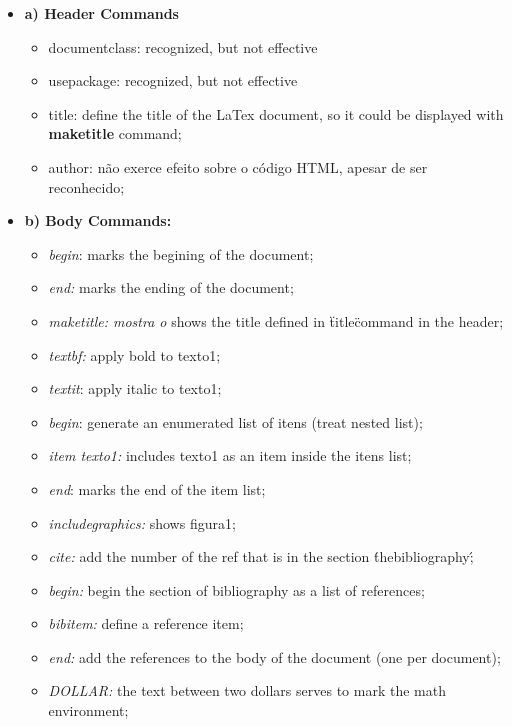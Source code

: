 \documentclass{article}
\begin{document}
\begin{itemize}

	\item \textbf{a) Header Commands}
		\begin{itemize}
			 \item documentclass: recognized, but not effective
			 \item usepackage:  recognized, but not effective
			 \item title: define the title of the LaTex document, so it could be displayed with \textbf{maketitle} command;
			 \item author: não exerce efeito sobre o código HTML, apesar de ser reconhecido;
		\end{itemize}

	\item \textbf{b) Body Commands:}
		\begin{itemize}
	 		\item \textit{begin}: marks the begining of the document;
	 		\item \textit{end:} marks the ending of the document;
	 		\item \textit{maketitle: mostra o} shows the title defined in \"title\" command in the header;
	 		\item \textit{textbf:} apply bold to texto1;
	 		\item \textit{textit}: apply italic to texto1;
	 		\item \textit{begin}: generate an enumerated list of itens (treat nested list);
	 		\item \textit{item texto1:} includes texto1 as an item inside the itens list; 
	 		\item \textit{end}: marks the end of the item list;
	 		\item \textit{includegraphics:} shows figura1;
	 		\item \textit{cite:} add the number of the ref that is in the section \'thebibliography\';
	 		\item \textit{begin:} begin the section of bibliography as a list of references;
	 		\item \textit{bibitem:} define a reference item;
	 		\item \textit{end:} add the references to the body of the document (one per document);
	 		\item \textit{DOLLAR:} the text between two dollars serves to mark the math environment;
		\end{itemize}

\end{itemize}
\end{document}
